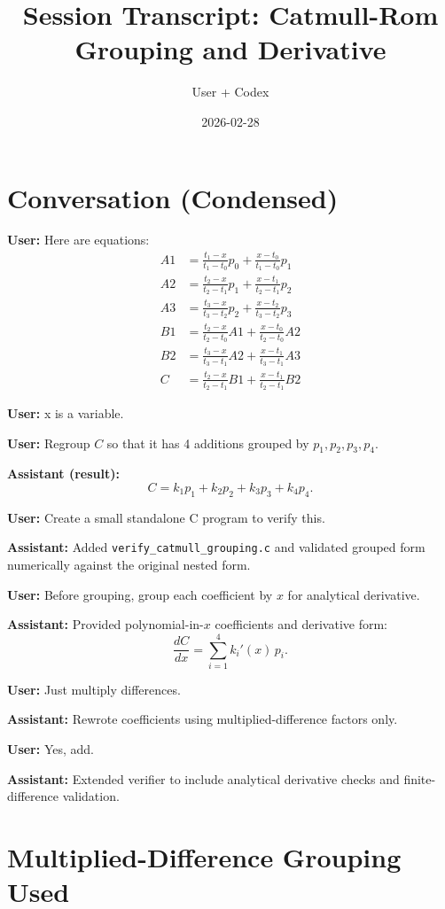 \documentclass[11pt]{article}
\title{Session Transcript: Catmull-Rom Grouping and Derivative}
\author{User + Codex}
\date{2026-02-28}
\begin{document}
\maketitle

\section*{Conversation (Condensed)}

\textbf{User:} Here are equations:
\begin{align*}
A1 &= \frac{t_1-x}{t_1-t_0}p_0 + \frac{x-t_0}{t_1-t_0}p_1 \\
A2 &= \frac{t_2-x}{t_2-t_1}p_1 + \frac{x-t_1}{t_2-t_1}p_2 \\
A3 &= \frac{t_3-x}{t_3-t_2}p_2 + \frac{x-t_2}{t_3-t_2}p_3 \\
B1 &= \frac{t_2-x}{t_2-t_0}A1 + \frac{x-t_0}{t_2-t_0}A2 \\
B2 &= \frac{t_3-x}{t_3-t_1}A2 + \frac{x-t_1}{t_3-t_1}A3 \\
C  &= \frac{t_2-x}{t_2-t_1}B1 + \frac{x-t_1}{t_2-t_1}B2
\end{align*}

\textbf{User:} x is a variable.

\textbf{User:} Regroup $C$ so that it has 4 additions grouped by $p_1,p_2,p_3,p_4$.

\textbf{Assistant (result):}
\[
C = k_1 p_1 + k_2 p_2 + k_3 p_3 + k_4 p_4.
\]

\textbf{User:} Create a small standalone C program to verify this.

\textbf{Assistant:} Added \texttt{verify\_catmull\_grouping.c} and validated grouped form numerically against the original nested form.

\textbf{User:} Before grouping, group each coefficient by $x$ for analytical derivative.

\textbf{Assistant:} Provided polynomial-in-$x$ coefficients and derivative form:
\[
\frac{dC}{dx} = \sum_{i=1}^{4} k_i'(x)\,p_i.
\]

\textbf{User:} Just multiply differences.

\textbf{Assistant:} Rewrote coefficients using multiplied-difference factors only.

\textbf{User:} Yes, add.

\textbf{Assistant:} Extended verifier to include analytical derivative checks and finite-difference validation.

\section*{Multiplied-Difference Grouping Used}
\end{document}
